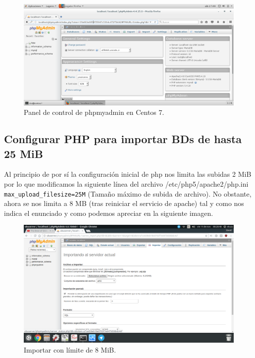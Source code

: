 \begin{flushleft}
\begin{figure}[H]
	\centering
	\includegraphics[scale=0.4]{phpmyadmin-c.png}
	\caption{Panel de control de phpmyadmin en Centos 7.}
\end{figure}

\subsection{Configurar PHP para importar BDs de hasta 25 MiB}
Al principio de por sí la configuración inicial de php nos limita las subidas 2 MiB por lo que modificamos la siguiente línea del archivo /etc/php5/apache2/php.ini \verb|max_upload_filesize=25M| (Tamaño máximo de subida de archivo). No obstante, ahora se nos limita a 8 MB (tras reiniciar el servicio de apache) tal y como nos indica el enunciado y como podemos apreciar en la siguiente imagen.
\begin{figure}[H]
	\centering
	\includegraphics[scale=0.3]{phpmyadmin4.png}
	\caption{Importar con límite de 8 MiB.}
\end{figure}


\end{flushleft}
